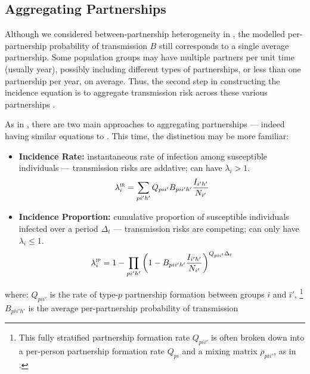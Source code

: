 \subsection{Aggregating Partnerships}\label{foi.prior.part}
Although we considered between-partnership heterogeneity in ,
the modelled per-partnership probability of transmission $B$
still corresponds to a single average partnership.
Some population groups may have multiple partners per unit time (usually year),
possibly including different types of partnerships,
or less than one partnership per year, on average.
Thus, the second step in constructing the incidence equation is to
aggregate transmission risk across these various partnerships \cite{Allard1990}.
\par
As in , there are two main approaches to aggregating partnerships
--- indeed having similar equations to .
This time, the distinction may be more familiar:
\begin{itemize}
  \item \textbf{Incidence Rate:}
  instantaneous rate of infection among susceptible individuals
  --- transmission risks are addative; can have $\lambda_i > 1$.
  \begin{equation}\label{eq:foi.ir}
    \lambda_i^\textsc{ir} = \sum_{pi'h'} Q_{pii'} B_{pii'h'} \frac{{I}_{i'h'}}{N_{i'}}
  \end{equation}
  \item \textbf{Incidence Proportion:}
  cumulative proportion of susceptible individuals infected over a period $\Delta_t$
  --- transmission risks are competing; can only have $\lambda_i \le 1$.
  \begin{equation}\label{eq:foi.ip}
    \lambda_i^\textsc{ip} = 1 - \prod_{pi'h'} {\left(1 - B_{pii'h'} \frac{{I}_{i'h'}}{N_{i'}}\right)}^{Q_{pii'} \Delta_t}
  \end{equation}
\end{itemize} where:
$Q_{pii'}$ is the rate of type-$p$ partnership formation between groups $i$ and $i'$,%
\footnote{This fully stratified partnership formation rate $Q_{pii'}$ is often broken down into
a per-person partnership formation rate $Q_{pi}$ and a mixing matrix $\rho_{pii'}$,
as in .}
$B_{pii'h'}$ is the average per-partnership probability of transmission

